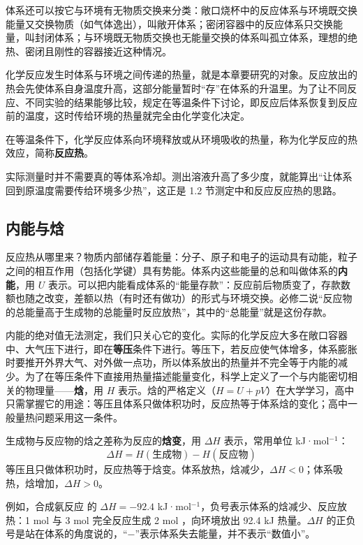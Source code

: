 体系还可以按它与环境有无物质交换来分类：敞口烧杯中的反应体系与环境既交换能量又交换物质（如气体逸出），叫敞开体系；密闭容器中的反应体系只交换能量，叫封闭体系；与环境既无物质交换也无能量交换的体系叫孤立体系，理想的绝热、密闭且刚性的容器接近这种情况。

化学反应发生时体系与环境之间传递的热量，就是本章要研究的对象。反应放出的热会先使体系自身温度升高，这部分能量暂时“存”在体系的升温里。为了让不同反应、不同实验的结果能够比较，规定在等温条件下讨论，即反应后体系恢复到反应前的温度，这时传给环境的热量就完全由化学变化决定。

\begin{gainian}[反应热]
在等温条件下，化学反应体系向环境释放或从环境吸收的热量，称为化学反应的热效应，简称\textbf{反应热}。
\end{gainian}

实际测量时并不需要真的等体系冷却。测出溶液升高了多少度，就能算出“让体系回到原温度需要传给环境多少热”，这正是 1.2 节测定中和反应反应热的思路。

\subsection{内能与焓}
反应热从哪里来？物质内部储存着能量：分子、原子和电子的运动具有动能，粒子之间的相互作用（包括化学键）具有势能。体系内这些能量的总和叫做体系的\textbf{内能}，用 $U$ 表示。可以把内能看成体系的“能量存款”：反应前后物质变了，存款数额也随之改变，差额以热（有时还有做功）的形式与环境交换。必修二说“反应物的总能量高于生成物的总能量时反应放热”，其中的“总能量”就是这份存款。

内能的绝对值无法测定，我们只关心它的变化。实际的化学反应大多在敞口容器中、大气压下进行，即在\textbf{等压}条件下进行。等压下，若反应使气体增多，体系膨胀时要推开外界大气、对外做一点功，所以体系放出的热量并不完全等于内能的减少。为了在等压条件下直接用热量描述能量变化，科学上定义了一个与内能密切相关的物理量——\textbf{焓}，用 $H$ 表示。焓的严格定义（$H=U+pV$）在大学学习，高中只需掌握它的用途：等压且体系只做体积功时，反应热等于体系焓的变化；高中一般量热问题采用这一条件。

\begin{gainian}[焓变]
生成物与反应物的焓之差称为反应的\textbf{焓变}，用 $\Delta H$ 表示，常用单位 kJ·mol$^{-1}$：
\[\Delta H=H(\text{生成物})-H(\text{反应物})\]
等压且只做体积功时，反应热等于焓变。体系放热，焓减少，$\Delta H<0$；体系吸热，焓增加，$\Delta H>0$。
\end{gainian}

例如，合成氨反应  的 $\Delta H=-92.4$ kJ·mol$^{-1}$，负号表示体系的焓减少、反应放热：1 mol  与 3 mol  完全反应生成 2 mol ，向环境放出 92.4 kJ 热量。$\Delta H$ 的正负号是站在体系的角度说的，“$-$”表示体系失去能量，并不表示“数值小”。

